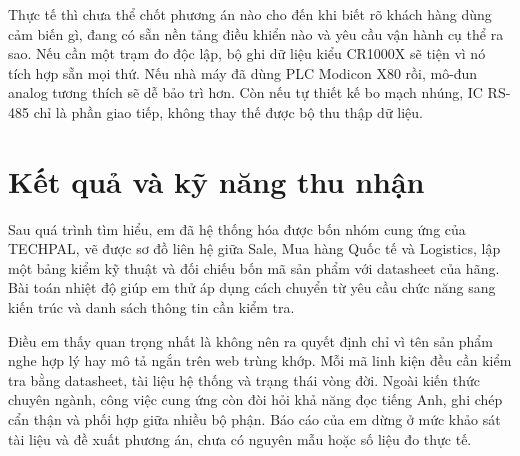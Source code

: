 Thực tế thì chưa thể chốt phương án nào cho đến khi biết rõ khách hàng dùng cảm
biến gì, đang có sẵn nền tảng điều khiển nào và yêu cầu vận hành cụ thể ra sao.
Nếu cần một trạm đo độc lập, bộ ghi dữ liệu kiểu CR1000X sẽ tiện vì nó tích hợp
sẵn mọi thứ. Nếu nhà máy đã dùng PLC Modicon X80 rồi, mô-đun analog tương thích
sẽ dễ bảo trì hơn. Còn nếu tự thiết kế bo mạch nhúng, IC RS-485 chỉ là phần giao
tiếp, không thay thế được bộ thu thập dữ liệu.

\section{Kết quả và kỹ năng thu nhận}

Sau quá trình tìm hiểu, em đã hệ thống hóa được bốn nhóm cung ứng của TECHPAL,
vẽ được sơ đồ liên hệ giữa Sale, Mua hàng Quốc tế và Logistics, lập một bảng
kiểm kỹ thuật và đối chiếu bốn mã sản phẩm với datasheet của hãng. Bài toán nhiệt
độ giúp em thử áp dụng cách chuyển từ yêu cầu chức năng sang kiến trúc và danh
sách thông tin cần kiểm tra.

Điều em thấy quan trọng nhất là không nên ra quyết định chỉ vì tên sản phẩm nghe
hợp lý hay mô tả ngắn trên web trùng khớp. Mỗi mã linh kiện đều cần kiểm tra
bằng datasheet, tài liệu hệ thống và trạng thái vòng đời. Ngoài kiến thức chuyên
ngành, công việc cung ứng còn đòi hỏi khả năng đọc tiếng Anh, ghi chép cẩn thận
và phối hợp giữa nhiều bộ phận. Báo cáo của em dừng ở mức khảo sát tài liệu và
đề xuất phương án, chưa có nguyên mẫu hoặc số liệu đo thực tế.
